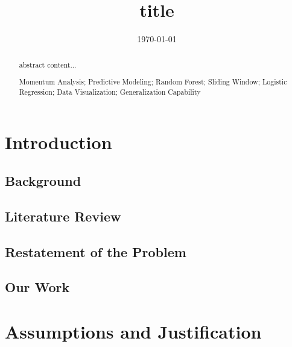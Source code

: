 \documentclass{mcmthesis}
\title{{\bf title}}
\date{\today}
\begin{document}
\begin{abstract}

    abstract content...

\begin{keywords}
    Momentum Analysis; Predictive Modeling; Random Forest; Sliding Window; Logistic Regression;
    Data Visualization; Generalization Capability
\end{keywords}
\end{abstract}


\maketitle

\tableofcontents
\thispagestyle{empty}

\newpage
\section{Introduction}

\subsection{Background}%

\subsection{Literature Review}%

\subsection{Restatement of the Problem}%


\subsection{Our Work}%


\section{Assumptions and Justification}
\end{document}
